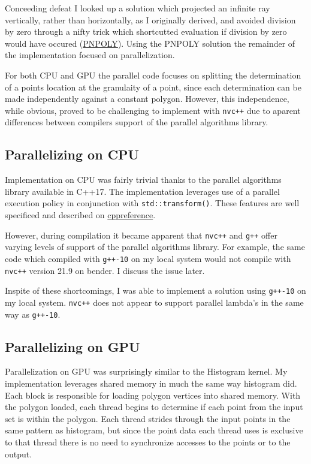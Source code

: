 \documentclass{article}
\begin{document}
Conceeding defeat I looked up a solution which projected an infinite ray vertically, rather than horizontally, as I originally derived, and avoided division by zero through a nifty trick which shortcutted evaluation if division by zero would have occured (\href{https://wrf.ecse.rpi.edu/Research/Short_Notes/pnpoly.html}{PNPOLY}). Using the PNPOLY solution the remainder of the implementation focused on parallelization.

For both CPU and GPU the parallel code focuses on splitting the determination of a points location at the granulaity of a point, since each determination can be made independently against a constant polygon. However, this independence, while obvious, proved to be challenging to implement with \texttt{nvc++} due to aparent differences between compilers support of the parallel algorithms library.

\subsection{Parallelizing on CPU}
Implementation on CPU was fairly trivial thanks to the parallel algorithms library available in C++17. The implementation leverages use of a parallel execution policy in conjunction with \texttt{std::transform()}.  These features are well specificed and described on \href{https://en.cppreference.com/w/cpp/algorithm/execution_policy_tag_t}{cppreference}. 

However, during compilation it became apparent that \texttt{nvc++} and \texttt{g++} offer varying levels of support of the parallel algorithms library. For example, the same code which compiled with \texttt{g++-10} on my local system would not compile with \texttt{nvc++} version 21.9 on bender. I discuss the issue later.

Inspite of these shortcomings, I was able to implement a solution using \texttt{g++-10} on my local system. \texttt{nvc++} does not appear to support parallel lambda's in the same way as \texttt{g++-10}.

\subsection{Parallelizing on GPU}
Parallelization on GPU was surprisingly similar to the Histogram kernel. My implementation leverages shared memory in much the same way histogram did. Each block is responsible for loading polygon vertices into shared memory. With the polygon loaded, each thread begins to determine if each point from the input set is within the polygon. Each thread strides through the input points in the same pattern as histogram, but since the point data each thread uses is exclusive to that thread there is no need to synchronize accesses to the points or to the output. 
\end{document}
